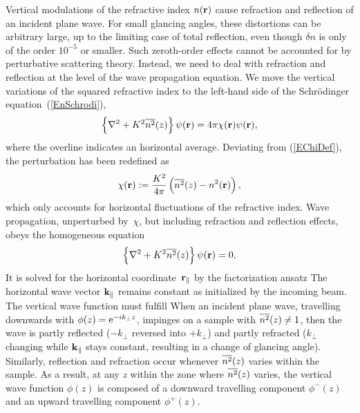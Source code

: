 Vertical modulations of the refractive index $n(\mathbf{r})$
cause refraction and reflection of an incident plane wave.
%
%
%
For small glancing angles,
these distortions can be arbitrary large,
up to the limiting case of total reflection,
even though $\delta n$ is only of the order $10^{-5}$ or smaller.
Such zeroth-order effects cannot be accounted for
by perturbative scattering theory.
Instead, we need to deal with refraction and reflection
at the level of the wave propagation equation.
We move the vertical variations of the squared refractive index
to the left-hand side of the Schrödinger equation~(\ref{EnSchrodi}),
\begin{equation}\label{EHelmholtzGraded}
  \left\{\mathbf{\nabla}^2+K^2\overline{n^2}(z)\right\}\psi(\mathbf{r})
  = 4\pi \chi(\mathbf{r}) \psi(\mathbf{r}),
\end{equation}
%
%
where the overline indicates an horizontal average.
Deviating from (\ref{EChiDef}),
the perturbation has been redefined as
\begin{equation}\label{EChiGraded}
  \chi(\mathbf{r}) := \frac{K^2}{4\pi}\left(\overline{n^2}(z)-n^2(\mathbf{r})\right),
\end{equation}
which only accounts for horizontal fluctuations of the refractive index.
Wave propagation,
unperturbed by~$\chi$, but including refraction and reflection effects,
obeys the homogeneous equation
\begin{equation}\label{EHelmholtzGradedHomog}
  \left\{\mathbf{\nabla}^2+K^2\overline{n^2}(z)\right\}\psi(\mathbf{r}) = 0.
\end{equation}
It is solved for the horizontal coordinate~$\mathbf{r}_\parallel$
by the factorization ansatz
%
%
The horizontal wave vector $\mathbf{k}_\parallel$ remains constant
as initialized by the incoming beam.
The vertical wave function must fulfill
When an incident plane wave,
travelling downwards with
$\phi(z)=\text{e}^{-ik_\perp z}$,
%
impinges on a sample with $\overline{n^2}(z)\ne 1$,
then the wave is partly reflected ($-k_\perp$ reversed into $+k_\perp$)
and partly refracted
($k_\perp$ changing while $\mathbf{k}_\parallel$ stays constant,
resulting in a change of glancing angle).
Similarly, reflection and refraction occur
whenever $\overline{n^2}(z)$ varies within the sample.
As a result, at any $z$ within the zone where $\overline{n^2}(z)$ varies,
the vertical wave function $\phi(z)$ is composed of a
downward travelling component $\phi^-(z)$
and an upward travelling component $\phi^+(z)$.

